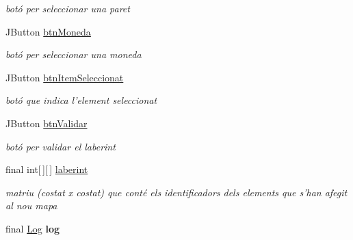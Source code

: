 \begin{DoxyCompactItemize}
\begin{DoxyCompactList}\small\item\em botó per seleccionar una paret \end{DoxyCompactList}\item 
\hypertarget{classinterficie_1_1_f_editor_laberint_a0743e614f6c7e1ae5a37ecab5308407a}{J\+Button \hyperlink{classinterficie_1_1_f_editor_laberint_a0743e614f6c7e1ae5a37ecab5308407a}{btn\+Moneda}}\label{classinterficie_1_1_f_editor_laberint_a0743e614f6c7e1ae5a37ecab5308407a}

\begin{DoxyCompactList}\small\item\em botó per seleccionar una moneda \end{DoxyCompactList}\item 
\hypertarget{classinterficie_1_1_f_editor_laberint_a224a51b6c96af0adda2975f5f0a3d3fd}{J\+Button \hyperlink{classinterficie_1_1_f_editor_laberint_a224a51b6c96af0adda2975f5f0a3d3fd}{btn\+Item\+Seleccionat}}\label{classinterficie_1_1_f_editor_laberint_a224a51b6c96af0adda2975f5f0a3d3fd}

\begin{DoxyCompactList}\small\item\em botó que indica l'element seleccionat \end{DoxyCompactList}\item 
\hypertarget{classinterficie_1_1_f_editor_laberint_aacb445c35fb6eeecea3298e8b8198e29}{J\+Button \hyperlink{classinterficie_1_1_f_editor_laberint_aacb445c35fb6eeecea3298e8b8198e29}{btn\+Validar}}\label{classinterficie_1_1_f_editor_laberint_aacb445c35fb6eeecea3298e8b8198e29}

\begin{DoxyCompactList}\small\item\em botó per validar el laberint \end{DoxyCompactList}\item 
\hypertarget{classinterficie_1_1_f_editor_laberint_a1b206b3f72b97d52432673e3d1e895e4}{final int\mbox{[}$\,$\mbox{]}\mbox{[}$\,$\mbox{]} \hyperlink{classinterficie_1_1_f_editor_laberint_a1b206b3f72b97d52432673e3d1e895e4}{laberint}}\label{classinterficie_1_1_f_editor_laberint_a1b206b3f72b97d52432673e3d1e895e4}

\begin{DoxyCompactList}\small\item\em matriu {\bfseries }(costat x costat) que conté els identificadors dels elements que s'han afegit al nou mapa \end{DoxyCompactList}\item 
\hypertarget{classinterficie_1_1_f_editor_laberint_aa4f4f0cab3ff32016e2b5b7d8082e6a1}{final \hyperlink{classlogica_1_1log_1_1_log}{Log} {\bfseries log}}\label{classinterficie_1_1_f_editor_laberint_aa4f4f0cab3ff32016e2b5b7d8082e6a1}


\end{DoxyCompactItemize}

